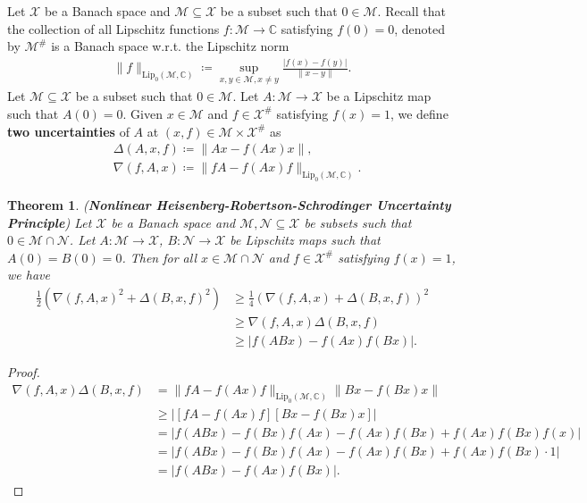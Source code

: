 \documentclass{amsart}
\newtheorem{theorem}{Theorem}[section]
\begin{document}
Let $\mathcal{X}$ be a Banach space and  $\mathcal{M}\subseteq  \mathcal{X}$ be a subset such that $0 \in \mathcal{M}$.  Recall that  the collection of all Lipschitz functions $f:  \mathcal{M}\to \mathbb{C}$  satisfying  $f(0)=0$, denoted by $ \mathcal{M}^\# $ is a Banach space \cite{WEAVER} w.r.t. the Lipschitz norm 
\begin{align*}
	\|f\|_{\text{Lip}_0(\mathcal{M}, \mathbb{C})}\coloneqq \sup_{x,y \in \mathcal{M}, x \neq y} \frac{|f(x)-f(y)|}{\|x-y\|}.
\end{align*}
Let  $\mathcal{M}\subseteq  \mathcal{X}$ be a subset such that $0 \in \mathcal{M}$. Let $A:\mathcal{M}\to  \mathcal{X}$ be a Lipschitz map such that $A(0)=0$.
Given $x\in \mathcal{M}$ and $f \in  \mathcal{X}^\# $ satisfying $f(x)=1$, we define \textbf{two  uncertainties} of  $A$ at $(x,f) \in \mathcal{M}\times  \mathcal{X}^\# $ as 
\begin{align*}
	&\Delta (A, x, f)\coloneqq \|Ax-f(Ax) x\|,\\
	&\nabla(f, A,x)\coloneqq \|fA-f(Ax) f\|_{\text{Lip}_0(\mathcal{M}, \mathbb{C})}.
\end{align*}
\begin{theorem} (\textbf{Nonlinear Heisenberg-Robertson-Schrodinger Uncertainty Principle}) \label{NHRS}
	Let  $\mathcal{X}$ be a Banach space and  $\mathcal{M}, \mathcal{N}\subseteq  \mathcal{X}$ be  subsets such that $0 \in \mathcal{M}\cap \mathcal{N}$. Let $A:\mathcal{M}\to  \mathcal{X}$, $B:\mathcal{N}\to  \mathcal{X}$ be  Lipschitz maps such that $A(0)=B(0)=0$.  Then  for all $x\in \mathcal{M}\cap \mathcal{N}$ and $f \in  \mathcal{X}^\# $ satisfying $f(x)=1$, we have 
	\begin{align*}
 \frac{1}{2} \left(\nabla(f, A,x)^2+\Delta (B, x, f)^2\right)&\geq \frac{1}{4} \left(\nabla(f, A,x)+	\Delta (B, x, f)\right)^2\\
 & \geq \nabla(f, A,x)\Delta (B, x, f)\\
 &\geq |f(ABx)-f(Ax)f(Bx)|.
	\end{align*}
\end{theorem}
\begin{proof}
	\begin{align*}
	\nabla(f, A,x)\Delta (B, x, f)&=\|fA-f(Ax) f\|_{\text{Lip}_0(\mathcal{M}, \mathbb{C})} \|Bx-f(Bx) x\|\\
	&\geq |[fA-f(Ax) f][Bx-f(Bx) x]|\\
	&=|f(ABx)-f(Bx)f(Ax)-f(Ax)f(Bx)+f(Ax)f(Bx)f(x)|\\
	&=|f(ABx)-f(Bx)f(Ax)-f(Ax)f(Bx)+f(Ax)f(Bx)\cdot 1|\\
	&=|f(ABx)-f(Ax)f(Bx)|.
\end{align*}	
\end{proof}
\end{document}
